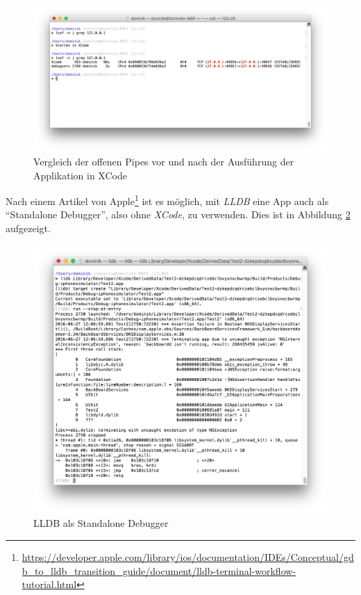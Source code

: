 \begin{figure}[htbp]
	\centering
	\includegraphics[width=\textwidth]{bilder/pentest_mobile_anwendungen/vergleich_aktuelle_situation/20160627_lsof_XCode_running.png}
	\caption{Vergleich der offenen Pipes vor und nach der Ausführung der Applikation in XCode}
	\label{fig:LSOFLLDB}
\end{figure}

Nach einem Artikel von Apple\footnote{\url{https://developer.apple.com/library/ios/documentation/IDEs/Conceptual/gdb_to_lldb_transition_guide/document/lldb-terminal-workflow-tutorial.html}} ist es möglich, mit \textit{LLDB} eine App auch als "`Standalone Debugger"', also ohne \textit{XCode}, zu verwenden. Dies ist in Abbildung \ref{fig:LLDBStandaloneDebugger} aufgezeigt.\\

\begin{figure}[htbp]
	\centering
	\includegraphics[width=\textwidth]{bilder/pentest_mobile_anwendungen/vergleich_aktuelle_situation/20160627_LLDB-Standalone-Debugger.png}
	\caption{LLDB als Standalone Debugger}
	\label{fig:LLDBStandaloneDebugger}
\end{figure}

